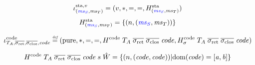 \documentclass[a4paper]{article}
\begin{document}
\[
  \stareg{v} = (v,*,=,=,H^\mathrm{sta}_{\stpair{\ms}{\ms}})
\]
\[
  H^\mathrm{sta}_{\stpair{\ms}{\ms}} = \{ \npair{\stpair{\ms}{\ms}} \}
\]


\[
  \codereg{\ta,\sigrets,\sigcloss,\code} \defeq (\pure,*,=,=,H^\mathrm{code} \; \ta \; \sigrets \; \sigcloss \; \code,H^\mathrm{code}_\sigma \; \ta \; \sigrets \; \sigcloss \; \code)
\]

\begin{equation*}
  H^\mathrm{code} \; \ta \; \sigrets \; \sigcloss \; \code \; s \; \hat{W} = \left\{\npair{(\code,\code)} \middle|
    \dom(\code) = [\aaddr,\baddr]
  \right\}
\end{equation*}
\end{document}
